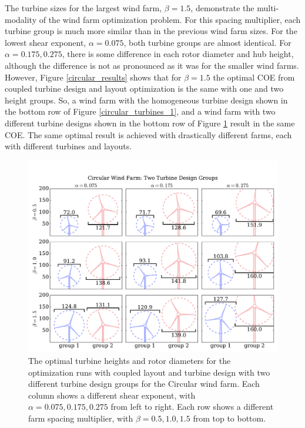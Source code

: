 The turbine sizes for the largest wind farm, $\beta=1.5$, demonstrate the multi-modality of the wind farm optimization problem. For this spacing multiplier, each turbine group is much more similar than in the previous wind farm sizes. For the lowest shear exponent, $\alpha=0.075$, both turbine groups are almost identical. For $\alpha=0.175,0.275$, there is some difference in each rotor diameter and hub height, although the difference is not as pronounced as it was for the smaller wind farms. However, Figure \ref{circular_results} shows that for $\beta=1.5$ the optimal COE from coupled turbine design and layout optimization is the same with one and two height groups. So, a wind farm with the homogeneous turbine design shown in the bottom row of Figure \ref{circular_turbines_1}, and a wind farm with two different turbine designs shown in the bottom row of Figure \ref{circular_turbines} result in the same COE. The same optimal result is achieved with drastically different farms, each with different turbines and layouts.  

\begin{figure}[htbp]
  \centering
  \includegraphics[trim={0.5cm 0.3cm 0.3cm 1.75cm},clip,width=\textwidth]{Figures/turbineSizesCircular_2.pdf}
  \caption{\label{circular_turbines} The optimal turbine heights and rotor diameters for the optimization runs with coupled layout and turbine design with two different turbine design groups for the Circular wind farm. Each column shows a different shear exponent, with $\alpha=0.075,0.175,0.275$ from left to right. Each row shows a different farm spacing multiplier, with $\beta=0.5,1.0,1.5$ from top to bottom.}
\end{figure}


